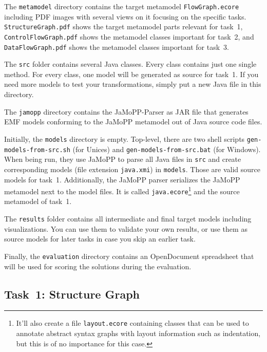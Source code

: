 \documentclass[11pt]{article}
\begin{document}
The \verb|metamodel| directory contains the target metamodel
\verb|FlowGraph.ecore| including PDF images with several views on it focusing
on the specific tasks.  \verb|StructureGraph.pdf| shows the target metamodel
parts relevant for task~1, \verb|ControlFlowGraph.pdf| shows the metamodel
classes important for task~2, and \verb|DataFlowGraph.pdf| shows the metamodel
classes important for task~3.

The \verb|src| folder contains several Java classes.  Every class contains just
one single method.  For every class, one model will be generated as source for
task~1.  If you need more models to test your transformations, simply put a new
Java file in this directory.

The \verb|jamopp| directory contains the JaMoPP-Parser as JAR file that
generates EMF models conforming to the JaMoPP metamodel out of Java source code
files.

Initially, the \verb|models| directory is empty.  Top-level, there are two
shell scripts \verb|gen-models-from-src.sh| (for Unices) and
\verb|gen-models-from-src.bat| (for Windows).  When being run, they use JaMoPP
to parse all Java files in \verb|src| and create corresponding models (file
extension \verb|java.xmi|) in \verb|models|.  Those are valid source models for
task~1.  Additionally, the JaMoPP parser serializes the JaMoPP metamodel next
to the model files.  It is called \verb|java.ecore|\footnote{It'll also create
  a file \texttt{layout.ecore} containing classes that can be used to annotate
  abstract syntax graphs with layout information such as indentation, but this
  is of no importance for this case.} and the source metamodel of task~1.

The \verb|results| folder contains all intermediate and final target models
including visualizations.  You can use them to validate your own results, or
use them as source models for later tasks in case you skip an earlier task.

Finally, the \verb|evaluation| directory contains an OpenDocument spreadsheet
that will be used for scoring the solutions during the evaluation.


\subsection{Task~1: Structure Graph}
\label{sec:task1-structure-graph}
\end{document}
